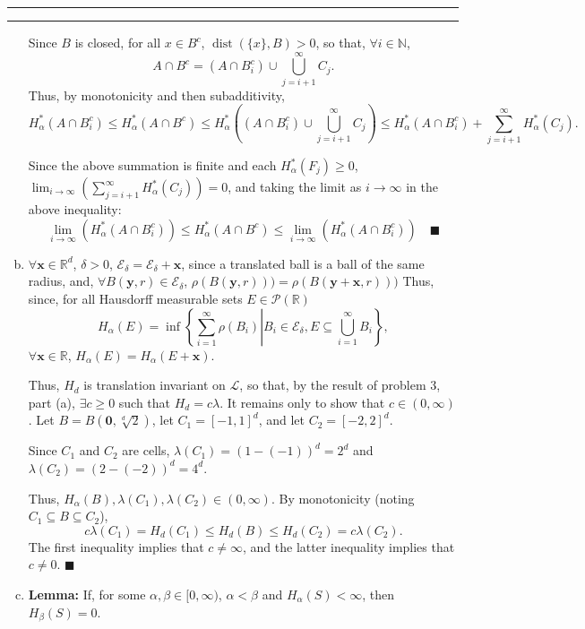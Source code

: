 \documentclass[11pt]{article}
\newcounter{questionCounter}
\newcounter{partCounter}[questionCounter]
\newenvironment{question}[2][\arabic{questionCounter}]{%
    \setcounter{partCounter}{0}%
    \vspace{.25in} \hrule \vspace{0.5em}%
        \noindent{\bf #2}%
    \vspace{0.8em} \hrule \vspace{.10in}%
    \addtocounter{questionCounter}{1}%
}{}
\renewcommand{\qed}{\quad $\blacksquare$}
\newcommand{\mqed}{\quad \blacksquare}
\newcommand{\bx}{\mathbf{x}}
\newcommand{\by}{\mathbf{y}}
\newcommand{\bzero}{\mathbf{0}}
\newcommand{\dist}{\operatorname{dist}}
\begin{document}
\begin{question}{Problem 4}
\begin{enumerate}[(a)]
Since $B$ is closed, for all $x \in B^c$, $\dist(\{x\},B) > 0$, so that,
$\forall i \in \mathbb{N}$,
\[A \cap B^c = (A \cap B_i^c) \cup \bigcup_{j = i + 1}^{\infty} C_j.\]
Thus, by monotonicity and then subadditivity,
\[H^*_{\alpha}(A \cap B_i^c)
 \leq H^*_{\alpha}(A \cap B^c)
 \leq H^*_{\alpha}\left((A \cap B_i^c) \cup \bigcup_{j = i + 1}^{\infty} C_j\right)
 \leq H^*_{\alpha}(A \cap B_i^c) + \sum_{j = i + 1}^{\infty} H^*_{\alpha}(C_j).
\]

Since the above summation is finite and each $H^*_{\alpha}(F_j) \geq 0$,
$\lim_{i \rightarrow \infty}
 \left(\sum_{j = i + 1}^{\infty} H^*_{\alpha}(C_j)\right) = 0$, and
taking the limit as $i \rightarrow \infty$ in the above inequality:
\[
 \lim_{i \rightarrow \infty}\left(H^*_{\alpha}(A \cap B_i^c)\right)
 \leq H^*_{\alpha}(A \cap B^c)
 \leq \lim_{i \rightarrow \infty}\left(H^*_{\alpha}(A \cap B_i^c)\right) \mqed
\]

\item $\forall \bx \in \mathbb{R}^d$, $\delta > 0$,
$\mathcal{E}_{\delta} = \mathcal{E}_{\delta} + \bx$, since a translated ball
is a ball of the same radius, and,
$\forall B(\by,r) \in \mathcal{E}_{\delta}$,
$\rho(B(\by,r))) = \rho(B(\by + \bx,r)))$ Thus, since,
for all Hausdorff measurable sets $E \in \mathcal{P}(\mathbb{R})$
\[H_{\alpha}(E)
 = \inf\left\{\sum_{i = 1}^{\infty} \rho(B_i)\right|
        \left. B_i \in \mathcal{E}_{\delta},
            E \subseteq \bigcup_{i = 1}^{\infty} B_i
\right\},\]
$\forall \bx \in \mathbb{R}$,
$H_{\alpha}(E) = H_{\alpha}(E + \bx)$.

Thus, $H_d$ is translation invariant on $\mathcal{L}$, so that, by the result
of problem 3, part (a), $\exists c \geq 0$ such that $H_d = c\lambda$. It
remains only to show that $c \in (0,\infty)$. Let $B = B(\bzero,\sqrt[d]{2})$,
let $C_1 = [-1,1]^d$, and let $C_2 = [-2,2]^d$.

Since $C_1$ and $C_2$ are cells, $\lambda(C_1) = (1 - (-1))^d = 2^d$ and
$\lambda(C_2) = (2 - (-2))^d = 4^d$.

Thus, $H_{\alpha}(B),\lambda(C_1),\lambda(C_2) \in (0,\infty)$. By
monotonicity (noting $C_1 \subseteq B \subseteq C_2$),
\[c\lambda(C_1) = H_d(C_1) \leq H_d(B) \leq H_d(C_2) = c\lambda(C_2).\]
The first inequality implies that $c \neq \infty$, and the latter inequality
implies that $c \neq 0$. \qed

\item {\bf Lemma:} If, for some $\alpha,\beta \in [0,\infty)$,
$\alpha < \beta$ and $H_{\alpha}(S) < \infty$, then $H_{\beta}(S) = 0$.


\end{enumerate}
\end{question}
\end{document}
